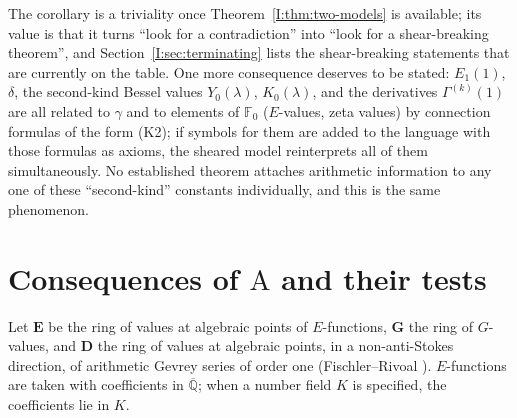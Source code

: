 \documentclass[11pt,a4paper]{article}
\newcommand{\Qbar}{\overline{\mathbb Q}}
\newcommand{\EE}{\mathbf E}
\newcommand{\GG}{\mathbf G}
\newcommand{\DD}{\mathbf D}
\newcommand{\Fld}{\mathbb F}
\theoremstyle{definition}
\theoremstyle{remark}
\numberwithin{equation}{section}
\begin{document}
The corollary is a triviality once Theorem~\ref{I:thm:two-models} is available; its value
is that it turns ``look for a contradiction'' into ``look for a shear-breaking theorem'',
and Section~\ref{I:sec:terminating} lists the shear-breaking statements that are currently
on the table. One more consequence deserves to be stated: $E_1(1)$, $\delta$, the
second-kind Bessel values $Y_0(\lambda)$, $K_0(\lambda)$, and the derivatives
$\Gamma^{(k)}(1)$ are all related to $\gamma$ and to elements of $\Fld_0$ ($E$-values,
zeta values) by connection formulas of the form (K2); if symbols for them are added to the language with those formulas as
axioms, the sheared model reinterprets all of them simultaneously. No established theorem
attaches arithmetic information to any one of these ``second-kind'' constants
individually, and this is the same phenomenon.

\section{Consequences of $\mathrm A$ and their tests}\label{I:sec:A}

Let $\EE$ be the ring of values at algebraic points of $E$-functions, $\GG$ the ring of
$G$-values, and $\DD$ the ring of values at algebraic points, in a non-anti-Stokes
direction, of arithmetic Gevrey series of order one (Fischler--Rivoal
\cite{FR2016,FRmixed}). $E$-functions are taken with coefficients in $\Qbar$; when a number
field $K$ is specified, the coefficients lie in $K$.
\end{document}
